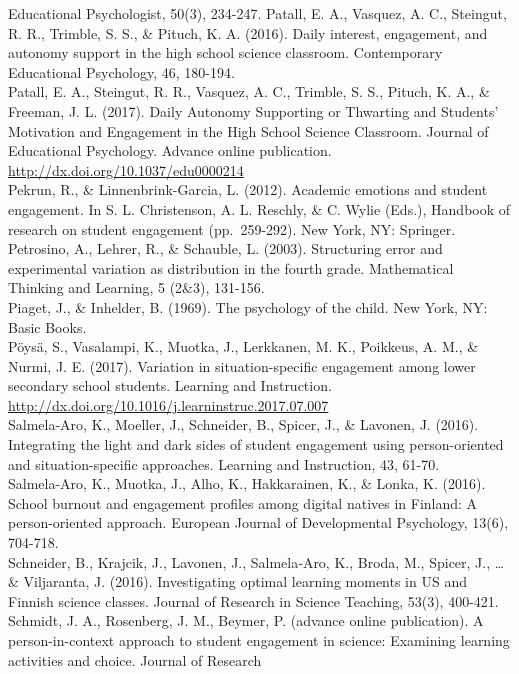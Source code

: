 \documentclass[]{book}
\theoremstyle{definition}
\theoremstyle{definition}
\theoremstyle{definition}
\theoremstyle{remark}
\begin{document}
Educational Psychologist, 50(3), 234-247. Patall, E. A., Vasquez, A. C.,
Steingut, R. R., Trimble, S. S., \& Pituch, K. A. (2016). Daily
interest, engagement, and autonomy support in the high school science
classroom. Contemporary Educational Psychology, 46, 180-194.\\
Patall, E. A., Steingut, R. R., Vasquez, A. C., Trimble, S. S., Pituch,
K. A., \& Freeman, J. L. (2017). Daily Autonomy Supporting or Thwarting
and Students' Motivation and Engagement in the High School Science
Classroom. Journal of Educational Psychology. Advance online
publication. \url{http://dx.doi.org/10.1037/edu0000214}\\
Pekrun, R., \& Linnenbrink-Garcia, L. (2012). Academic emotions and
student engagement. In S. L. Christenson, A. L. Reschly, \& C. Wylie
(Eds.), Handbook of research on student engagement (pp.~259-292). New
York, NY: Springer.\\
Petrosino, A., Lehrer, R., \& Schauble, L. (2003). Structuring error and
experimental variation as distribution in the fourth grade. Mathematical
Thinking and Learning, 5 (2\&3), 131-156.\\
Piaget, J., \& Inhelder, B. (1969). The psychology of the child. New
York, NY: Basic Books.\\
Pöysä, S., Vasalampi, K., Muotka, J., Lerkkanen, M. K., Poikkeus, A. M.,
\& Nurmi, J. E. (2017). Variation in situation-specific engagement among
lower secondary school students. Learning and Instruction.
\url{http://dx.doi.org/10.1016/j.learninstruc.2017.07.007}\\
Salmela-Aro, K., Moeller, J., Schneider, B., Spicer, J., \& Lavonen, J.
(2016). Integrating the light and dark sides of student engagement using
person-oriented and situation-specific approaches. Learning and
Instruction, 43, 61-70.\\
Salmela-Aro, K., Muotka, J., Alho, K., Hakkarainen, K., \& Lonka, K.
(2016). School burnout and engagement profiles among digital natives in
Finland: A person-oriented approach. European Journal of Developmental
Psychology, 13(6), 704-718.\\
Schneider, B., Krajcik, J., Lavonen, J., Salmela‐Aro, K., Broda, M.,
Spicer, J., \ldots{} \& Viljaranta, J. (2016). Investigating optimal
learning moments in US and Finnish science classes. Journal of Research
in Science Teaching, 53(3), 400-421.\\
Schmidt, J. A., Rosenberg, J. M., Beymer, P. (advance online
publication). A person-in-context approach to student engagement in
science: Examining learning activities and choice. Journal of Research
\end{document}
